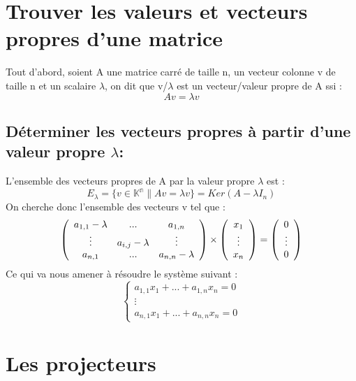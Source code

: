 \documentclass{article}
\begin{document}
\section{Trouver les valeurs et vecteurs propres d'une matrice}
Tout d'abord, soient A une matrice carré de taille n, un vecteur colonne v de taille n et un scalaire $\lambda$, on dit que v/$\lambda$ est un vecteur/valeur propre de A ssi :
\[ Av = \lambda v \]

\subsection{Déterminer les vecteurs propres à partir d'une valeur propre $\lambda$:}
L'ensemble des vecteurs propres de A par la valeur propre $\lambda$ est :
\[ E_{\lambda}=\{v\in\mathbb{K^{n}} \| Av = \lambda v\} = Ker(A-\lambda I_{n})\]
On cherche donc l'ensemble des vecteurs v tel que :
\[\left(
  \begin{array}{c c c}
    a_{1,1}-\lambda & ... & a_{1,n} \\
    \vdots & a_{i,j}- \lambda & \vdots \\
    a_{n,1} & ... & a_{n,n} - \lambda
  \end{array}\right)\times
\left(
  \begin{array}{c}
    x_{1} \\
    \vdots \\
    x_{n}
  \end{array}
\right) = \left(
  \begin{array}{c}
    0 \\
    \vdots \\
    0
  \end{array}
\right)
\]
Ce qui va nous amener à résoudre le système suivant :
\[\left\{
  \begin{array}{l}
    a_{1,1}x_{1} + ... + a_{1,n}x_{n} = 0 \\
    \vdots \\
    a_{n,1}x_{1} + ... + a_{n,n}x_{n} = 0
  \end{array}

\]
\section{Les projecteurs}
\end{document}
